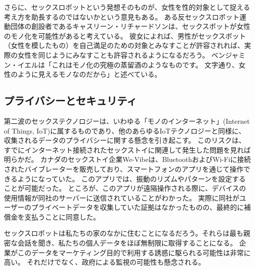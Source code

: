 \documentclass[paper=a4,book,openany]{jlreq}
\newcommand{\ig}[1]{}           %
\begin{document}
さらに、セックスロボットという発想そのものが、女性を性的対象として捉える考え方を助長するのではないかという意見もある。
ある反セックスロボット運動団体の創設者であるキャスリーン・リチャードソン\ig{Kathleen Richardson}は、セックスボットが女性のモノ化を可能性があると考えている。
彼女によれば、男性がセックスボット（女性を模したもの）を自己満足のための対象とみなすことが許容されれば、実際の女性を同じようにみなすことも許容されるようになるだろう\citep{richardson16:_asymm_relat}。
ベンジャミン・イエルは「これはモノ化の究極の蒸留酒のようなものです。
文字通り、女性のように見えるモノなのだから」と述べている\citep{mcdonald19:_sex_robot_are_almos_here}。

\subsection{プライバシーとセキュリティ}

第二波のセックステクノロジーは、いわゆる「モノのインターネット」(Internet of Things, IoT)に属するものであり、他のあらゆるIoTテクノロジーと同様に、収集されるデータのプライバシーに関する懸念を引き起こす。
このリスクは、すでにインターネット接続されたセックストイに関連して発生した問題を見れば明らかだ。
カナダのセックストイ企業We-Vibeは、BluetoothおよびWi-Fiに接続されたバイブレーターを販売しており、スマートフォンのアプリを通じて操作できるようになっていた。
このアプリでは、振動のリズムやパターンを設定することが可能だった。
ところが、このアプリが遠隔操作される際に、デバイスの使用情報が同社のサーバーに送信されていることがわかった。
実際に同社がユーザーのプライベートデータを収集していた証拠はなかったものの、最終的に補償金を支払うことに同意した\citep{freytas-tamura17:_maker_smart_vibrat_settl_data}。

セックスロボットは私たちの家のなかに住むことになるだろう。それらは最も親密な会話を聞き、私たちの個人データをほぼ無制限に取得することになる。
企業がこのデータをマーケティング目的で利用する誘惑に駆られる可能性は非常に高い。
それだけでなく、政府による監視の可能性も懸念される。
\end{document}
